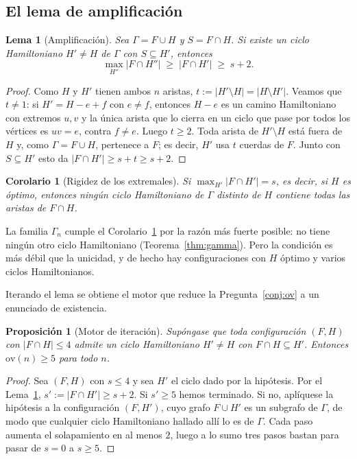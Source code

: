 \documentclass[11pt,a4paper]{article}
\newtheorem{lema}[teorema]{Lema}
\newtheorem{proposicion}[teorema]{Proposición}
\newtheorem{corolario}[teorema]{Corolario}
\theoremstyle{definition}
\theoremstyle{remark}
\begin{document}
\subsection{El lema de amplificación}

\begin{lema}[Amplificación]\label{lem:amplifica}
Sea $\Gamma=F\cup H$ y $S=F\cap H$. Si existe un ciclo Hamiltoniano $H'\ne H$ de $\Gamma$ con $S\subseteq H'$, entonces
\[
\max_{H''}|F\cap H''|\;\ge\;|F\cap H'|\;\ge\;s+2 .
\]
\end{lema}

\begin{proof}
Como $H$ y $H'$ tienen ambos $n$ aristas, $t:=|H'\setminus H|=|H\setminus H'|$. Veamos que $t\ne1$: si $H'=H-e+f$ con $e\ne f$, entonces $H-e$ es un camino Hamiltoniano con extremos $u,v$ y la única arista que lo cierra en un ciclo que pase por todos los vértices es $uv=e$, contra $f\ne e$. Luego $t\ge2$. Toda arista de $H'\setminus H$ está fuera de $H$ y, como $\Gamma=F\cup H$, pertenece a $F$; es decir, $H'$ usa $t$ cuerdas de $F$. Junto con $S\subseteq H'$ esto da $|F\cap H'|\ge s+t\ge s+2$.
\end{proof}

\begin{corolario}[Rigidez de los extremales]\label{cor:rigidez}
Si $\max_{H'}|F\cap H'|=s$, es decir, si $H$ es óptimo, entonces \emph{ningún} ciclo Hamiltoniano de $\Gamma$ distinto de $H$ contiene todas las aristas de $F\cap H$.
\end{corolario}

La familia $\Gamma_n$ cumple el Corolario~\ref{cor:rigidez} por la razón más fuerte posible: no tiene ningún otro ciclo Hamiltoniano (Teorema~\ref{thm:gamma}). Pero la condición es más débil que la unicidad, y de hecho hay configuraciones con $H$ óptimo y varios ciclos Hamiltonianos.

Iterando el lema se obtiene el motor que reduce la Pregunta~\ref{conj:ov} a un enunciado de existencia.

\begin{proposicion}[Motor de iteración]\label{prop:motor}
Supóngase que toda configuración $(F,H)$ con $|F\cap H|\le4$ admite un ciclo Hamiltoniano $H'\ne H$ con $F\cap H\subseteq H'$. Entonces $\mathrm{ov}(n)\ge5$ para todo $n$.
\end{proposicion}

\begin{proof}
Sea $(F,H)$ con $s\le4$ y sea $H'$ el ciclo dado por la hipótesis. Por el Lema~\ref{lem:amplifica}, $s':=|F\cap H'|\ge s+2$. Si $s'\ge5$ hemos terminado. Si no, aplíquese la hipótesis a la configuración $(F,H')$, cuyo grafo $F\cup H'$ es un subgrafo de $\Gamma$, de modo que cualquier ciclo Hamiltoniano hallado allí lo es de $\Gamma$. Cada paso aumenta el solapamiento en al menos $2$, luego a lo sumo tres pasos bastan para pasar de $s=0$ a $s\ge5$.
\end{proof}
\end{document}
